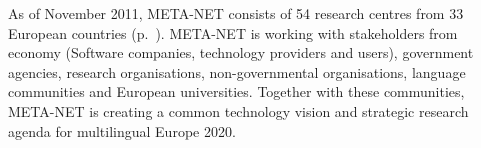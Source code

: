 \begin{Parallel}[c]{78mm}{78mm}
{As of November 2011, META-NET consists of 54 research centres from 33
European countries (p.~\pageref{metanetmembers}). META-NET is working
with stakeholders from economy (Software companies, technology
providers and users), government agencies, research organisations, non-governmental organisations, language communities and European universities. Together with these communities, META-NET is creating a common technology vision and strategic research agenda for multilingual Europe 2020.}
\ParallelPar
\end{Parallel}

\makefundingnotice


\cleardoublepage
{}


\renewcommand\contentsname{}
\tableofcontents




\cleardoublepage

\setcounter{page}{1}
\pagestyle{scrheadings}


